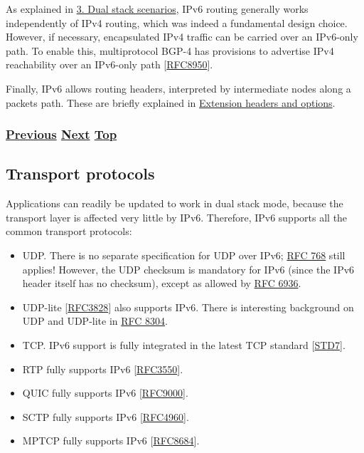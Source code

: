 \documentclass[
]{article}
\begin{document}
As explained in \hyperref[dual-stack-scenarios]{3. Dual stack
scenarios}, IPv6 routing generally works independently of IPv4 routing,
which was indeed a fundamental design choice. However, if necessary,
encapsulated IPv4 traffic can be carried over an IPv6-only path. To
enable this, multiprotocol BGP-4 has provisions to advertise IPv4
reachability over an IPv6-only path
{[}\href{https://www.rfc-editor.org/info/rfc8950}{RFC8950}{]}.

Finally, IPv6 allows routing headers, interpreted by intermediate nodes
along a packet\textquotesingle s path. These are briefly explained in
\hyperref[extension-headers-and-options]{Extension headers and options}.

\subsubsection{\texorpdfstring{\hyperref[dns]{Previous}
\hyperref[transport-protocols]{Next}
\hyperref[ipv6-basic-technology]{Top}}{Previous Next Top}}\label{previous-next-top-14}

\pagebreak

\subsection{Transport protocols}\label{transport-protocols}

Applications can readily be updated to work in dual stack mode, because
the transport layer is affected very little by IPv6. Therefore, IPv6
supports all the common transport protocols:

\begin{itemize}
\item
  UDP. There is no separate specification for UDP over IPv6;
  \href{https://www.rfc-editor.org/info/rfc768}{RFC 768} still applies!
  However, the UDP checksum is mandatory for IPv6 (since the IPv6 header
  itself has no checksum), except as allowed by
  \href{https://www.rfc-editor.org/info/rfc6936}{RFC 6936}.
\item
  UDP-lite {[}\href{https://www.rfc-editor.org/info/rfc3828}{RFC3828}{]}
  also supports IPv6. There is interesting background on UDP and
  UDP-lite in \href{https://www.rfc-editor.org/info/rfc8304}{RFC 8304}.
\item
  TCP. IPv6 support is fully integrated in the latest TCP standard
  {[}\href{https://www.rfc-editor.org/info/std7}{STD7}{]}.
\item
  RTP fully supports IPv6
  {[}\href{https://www.rfc-editor.org/info/rfc3550}{RFC3550}{]}.
\item
  QUIC fully supports IPv6
  {[}\href{https://www.rfc-editor.org/info/rfc9000}{RFC9000}{]}.
\item
  SCTP fully supports IPv6
  {[}\href{https://www.rfc-editor.org/info/rfc4960}{RFC4960}{]}.
\item
  MPTCP fully supports IPv6
  {[}\href{https://www.rfc-editor.org/info/rfc8684}{RFC8684}{]}.
\end{itemize}
\end{document}
